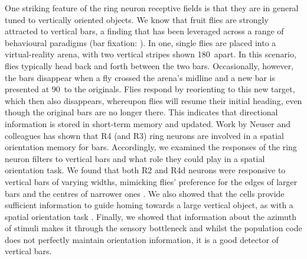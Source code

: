 \begin{comment}
There is a danger of conflating the experimenter's task with with the animal's ability.
That is, it may be that flies are able to discriminate two patterns differing in vertical centre of mass, but that does not mean that flies are able to distinguish the patterns \emph{because} of the difference in centre of mass.
[Instead better to look at what behaviours can be performed with a particular visual encoding] -- e.g. place learning \cite{Dewar2015}.

[
Unlike for bees, pattern recognition does not seem likely to be an ecologically important behaviour in flies. However, behavioural experiments show some [something] ability (3). \\
	(1) might be by-product of other behaviours \\
	(2) danger of interpreting discrimination as meaning flies...

Can we cite Biosystems in here?]
\end{comment}

One striking feature of the ring neuron receptive fields is that they are in general tuned to vertically oriented objects. We know that fruit flies are strongly attracted to vertical bars, a finding that has been leveraged across a range of behavioural paradigms (bar fixation: \cite{Neuser2008}). In one, single flies are placed into a virtual-reality arena, with two vertical stripes shown 180\degree\ apart. In this scenario, flies typically head back and forth between the two bars. Occasionally, however, the bars disappear when a fly crossed the arena’s midline and a new bar is presented at 90\degree\ to the originals. Flies respond by reorienting to this new target, which then also disappears, whereupon flies will resume their initial heading, even though the original bars are no longer there. This indicates that directional information is stored in short-term memory and updated. Work by Neuser and colleagues \cite{Neuser2008} has shown that R4 (and R3) ring neurons are involved in a spatial orientation memory for bars. Accordingly, we examined the responses of the ring neuron filters to vertical bars and what role they could play in a spatial orientation task. We found that both R2 and R4d neurons were responsive to vertical bars of varying widths, mimicking flies' preference for the edges of larger bars and the centres of narrower ones \cite{Osorio1990}. We also showed that the cells provide sufficient information to guide homing towards a large vertical object, as with a spatial orientation task \cite{Neuser2008}. Finally, we showed that information about the azimuth of stimuli makes it through the sensory bottleneck and whilst the population code does not perfectly maintain orientation information, it is a good detector of vertical bars.

